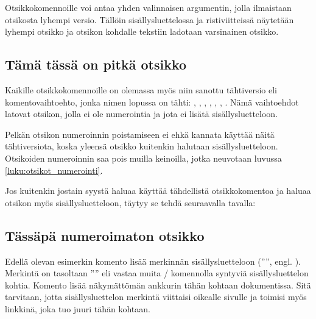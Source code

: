 Otsikkokomennoille voi antaa yhden valinnaisen argumentin, jolla
ilmaistaan otsikosta lyhempi versio. Tällöin sisällysluettelossa ja
ristiviitteissä näytetään lyhempi otsikko ja otsikon kohdalle tekstiin
ladotaan varsinainen otsikko.

\begin{koodilohkosis}
  \section[Lyhyt otsikko]{Tämä tässä on pitkä otsikko}
\end{koodilohkosis}

Kaikille otsikkokomennoille on olemassa myös niin sanottu tähtiversio
eli komentovaihtoehto, jonka nimen lopussa on tähti: ,
, , ,
, , .
Nämä vaihtoehdot latovat otsikon, jolla ei ole numerointia ja jota ei
lisätä sisällysluetteloon.

Pelkän otsikon numeroinnin poistamiseen ei ehkä kannata käyttää näitä
tähtiversiota, koska yleensä otsikko kuitenkin halutaan
sisällysluetteloon. Otsikoiden numeroinnin saa pois muilla keinoilla,
jotka neuvotaan luvussa \ref{luku:otsikot_numerointi}.

Jos kuitenkin jostain syystä haluaa käyttää tähdellistä otsikkokomentoa
ja haluaa otsikon myös sisällysluetteloon, täytyy se tehdä seuraavalla
tavalla:

\begin{koodilohkosis}
  \section*{Tässäpä numeroimaton otsikko}
\end{koodilohkosis}

Edellä olevan esimerkin komento  lisää
merkinnän sisällysluetteloon ('''', engl.
). Merkintä on tasoltaan
'''' eli vastaa muita \-/ komennolla
syntyviä sisällysluettelon kohtia. Komento 
lisää näkymättömän ankkurin tähän kohtaan dokumentissa. Sitä tarvitaan,
jotta sisällysluettelon merkintä viittaisi oikealle sivulle ja toimisi
myös linkkinä, joka tuo juuri tähän kohtaan.

